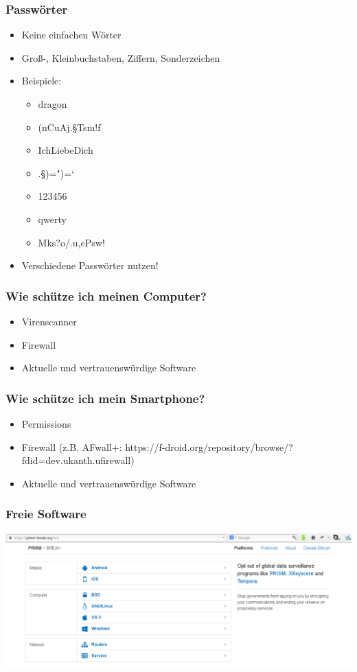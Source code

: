 \documentclass[12pt]{beamer}
\begin{document}
\begin{frame}
    \frametitle{Passwörter}
    \begin{itemize}
        \item<2-> Keine einfachen Wörter
        \item<3-> Groß-, Kleinbuchstaben, Ziffern, Sonderzeichen
        \item<4-> Beispiele:
            \begin{itemize}
                \item<5-> dragon
                \item<6-> (nCuAj.§Tsm!f
                \item<7-> IchLiebeDich
                \item<8-> .§)=")=`
                \item<9-> 123456
                \item<10-> qwerty
                \item<11-> Mks?o/.u,ePsw!
            \end{itemize}
        \item<12-> Verschiedene Passwörter nutzen!
    \end{itemize}
\end{frame}

\begin{frame}
    \frametitle{Wie schütze ich meinen Computer?}
    \begin{itemize}
      \item Virenscanner
      \item Firewall
      \item Aktuelle und vertrauenswürdige Software
    \end{itemize}
\end{frame}

\begin{frame}
    \frametitle{Wie schütze ich mein Smartphone?}
    \begin{itemize}
      \item Permissions
      \item Firewall (z.B. AFwall+: https://f-droid.org/repository/browse/?fdid=dev.ukanth.ufirewall)
      \item Aktuelle und vertrauenswürdige Software
    \end{itemize}
\end{frame}

\begin{frame}
    \frametitle{Freie Software}
    \includegraphics[height=0.7\textheight]{img/prism-break1.png}
\end{frame}
\end{document}
